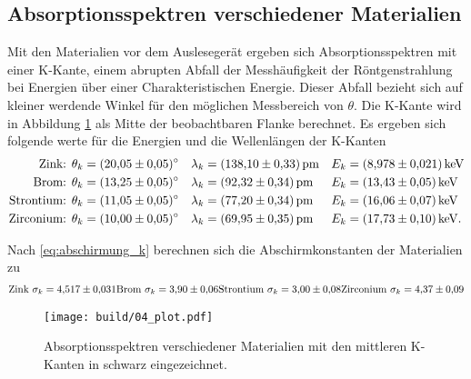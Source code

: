\subsection{Absorptionsspektren verschiedener Materialien}
Mit den Materialien vor dem Auslesegerät ergeben sich Absorptionsspektren mit einer K-Kante, einem abrupten Abfall
der Messhäufigkeit der Röntgenstrahlung bei Energien über einer Charakteristischen Energie.
Dieser Abfall bezieht sich auf kleiner werdende Winkel für den möglichen Messbereich von $\theta$.
Die K-Kante wird in Abbildung \ref{fig:04} als Mitte der beobachtbaren Flanke berechnet.
Es ergeben sich folgende werte für die Energien und die Wellenlängen der K-Kanten
\begin{align*}
    \text{Zink:       } \theta_k &= \qty{20.05 \pm 0.05}{\degree} & \lambda_k &= \qty{138.10 \pm 0.33}{\pico\meter} & E_k &= \qty{8.978 \pm 0.021}{ \kilo\eV } \\
    \text{Brom:       } \theta_k &= \qty{13.25 \pm 0.05}{\degree} & \lambda_k &= \qty{92.32 \pm 0.34 }{\pico\meter} & E_k &= \qty{13.43 \pm 0.05 }{ \kilo\eV }\\
    \text{Strontium:  } \theta_k &= \qty{11.05 \pm 0.05}{\degree} & \lambda_k &= \qty{77.20 \pm 0.34 }{\pico\meter} & E_k &= \qty{16.06 \pm 0.07 }{ \kilo\eV }\\
    \text{Zirconium:  } \theta_k &= \qty{10.00 \pm 0.05}{\degree} & \lambda_k &= \qty{69.95 \pm 0.35 }{\pico\meter} & E_k &= \qty{17.73 \pm 0.10}{\kilo\eV}. \\
\end{align*}

\noindent
Nach \eqref{eq:abschirmung_k} berechnen sich die Abschirmkonstanten der Materialien zu
\begin{align}
    \text{Zink      } \sigma_k = \num{4.517 \pm 0.031}
    \text{Brom      } \sigma_k = \num{3.90 \pm 0.06}
    \text{Strontium } \sigma_k = \num{3.00 \pm 0.08}
    \text{Zirconium } \sigma_k = \num{4.37 \pm 0.09}
\end{align}

\begin{figure}
    \centering
    \texttt{[image: build/04\_plot.pdf]}
    \caption{Absorptionsspektren verschiedener Materialien mit den mittleren K-Kanten in schwarz eingezeichnet.}
    \label{fig:04}
\end{figure}






